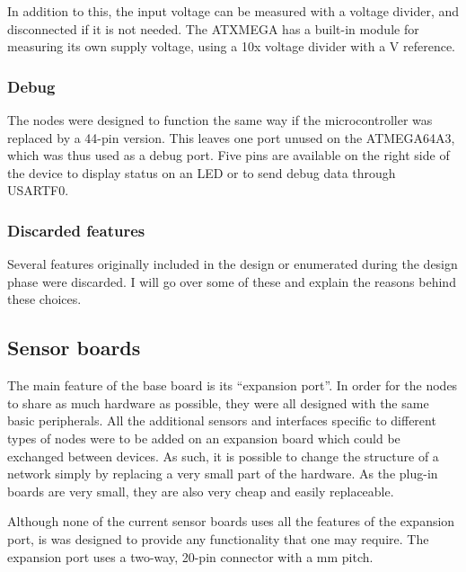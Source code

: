 In addition to this, the input voltage can be measured with a voltage divider,
and disconnected if it is not needed. The ATXMEGA has a built-in module for
measuring its own supply voltage, using a 10x voltage divider with a \unit[1]{V}
reference.

\subsubsection{Debug}

The nodes were designed to function the same way if the microcontroller was
replaced by a 44-pin version. This leaves one port unused on the ATMEGA64A3,
which was thus used as a debug port. Five pins are available on the right side
of the device to display status on an LED or to send debug data through USARTF0.

\subsubsection{Discarded features}

Several features originally included in the design or enumerated during the
design phase were discarded. I will go over some of these and explain the
reasons behind these choices.


\subsection{Sensor boards}

The main feature of the base board is its ``expansion port''. In order for the
nodes to share as much hardware as possible, they were all designed with the
same basic peripherals. All the additional sensors and interfaces specific to
different types of nodes were to be added on an expansion board which could be
exchanged between devices. As such, it is possible to change the structure of a
network simply by replacing a very small part of the hardware. As the plug-in
boards are very small, they are also very cheap and easily replaceable.

Although none of the current sensor boards uses all the features of the
expansion port, is was designed to provide any functionality that one may
require. The expansion port uses a two-way, 20-pin connector with a \unit[2]{mm}
pitch.

